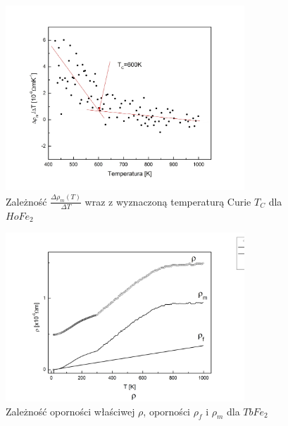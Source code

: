 \documentclass[a4paper,12pt]{article}
\numberwithin{equation}{section}
\begin{document}
\begin{figure}[ht]
    \centering
    \includegraphics[width =0.8\textwidth]{../img/opor/pochodnaHo}
    \caption{Zależność $\frac{\Delta\rho_m(T)}{\Delta T}$ wraz z wyznaczoną temperaturą Curie $T_C$ dla $HoFe_2$}
    \label{skladoweHo}
\end{figure}




\begin{figure}[ht]
    \centering
    \includegraphics[width =0.8\textwidth]{../img/opor/skladoweTb}
    \caption{Zależność oporności właściwej $\rho$, oporności $\rho_f$ i $\rho_m$ dla $TbFe_2$}
    \label{skladoweTb}
\end{figure}
\end{document}
